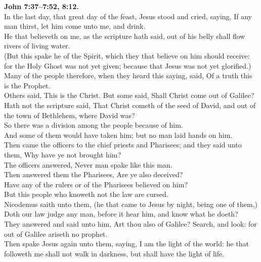\documentclass[10pt]{article} %
\begin{document}
{\begin{minipage}[t]{0.45\textwidth}
\textbf{John 7:37--7:52, 8:12.}\\
In the last day, that great day of the feast, Jesus stood and cried, saying, If any man thirst, let him come unto me, and drink.\\
He that believeth on me, as the scripture hath said, out of his belly shall flow rivers of living water.\\
(But this spake he of the Spirit, which they that believe on him should receive: for the Holy Ghost was not yet given; because that Jesus was not yet glorified.)\\
Many of the people therefore, when they heard this saying, said, Of a truth this is the Prophet.\\
Others said, This is the Christ. But some said, Shall Christ come out of Galilee?\\
Hath not the scripture said, That Christ cometh of the seed of David, and out of the town of Bethlehem, where David was?\\
So there was a division among the people because of him.\\
And some of them would have taken him; but no man laid hands on him.\\
Then came the officers to the chief priests and Pharisees; and they said unto them, Why have ye not brought him?\\
The officers answered, Never man spake like this man.\\
Then answered them the Pharisees, Are ye also deceived?\\
Have any of the rulers or of the Pharisees believed on him?\\
But this people who knoweth not the law are cursed.\\
Nicodemus saith unto them, (he that came to Jesus by night, being one of them,)\\
Doth our law judge any man, before it hear him, and know what he doeth?\\
They answered and said unto him, Art thou also of Galilee? Search, and look: for out of Galilee ariseth no prophet.\\
Then spake Jesus again unto them, saying, I am the light of the world: he that followeth me shall not walk in darkness, but shall have the 
light of life.\\
\end{minipage}}
\vspace*{\fill}
\newpage
\huge%
\vspace*{\fill}
\end{document}
